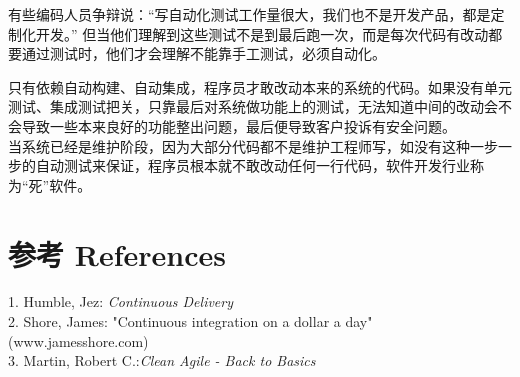 有些编码人员争辩说：``写自动化测试工作量很大，我们也不是开发产品，都是定制化开发。''
但当他们理解到这些测试不是到最后跑一次，而是每次代码有改动都要通过测试时，他们才会理解不能靠手工测试，必须自动化。

只有依赖自动构建、自动集成，程序员才敢改动本来的系统的代码。如果没有单元测试、集成测试把关，只靠最后对系统做功能上的测试，无法知道中间的改动会不会导致一些本来良好的功能整出问题，最后便导致客户投诉有安全问题。\\
当系统已经是维护阶段，因为大部分代码都不是维护工程师写，如没有这种一步一步的自动测试来保证，程序员根本就不敢改动任何一行代码，软件开发行业称为``死''软件。\\

\hypertarget{ux9644ux4ef6}{%
\section{参考 References}\label{ux9644ux4ef6}}

1. Humble, Jez: \emph{Continuous Delivery}\\
2. Shore, James: "Continuous integration on a dollar a day"
(www.jamesshore.com)\\
3. Martin, Robert C.:\emph{Clean Agile - Back to Basics}\\




